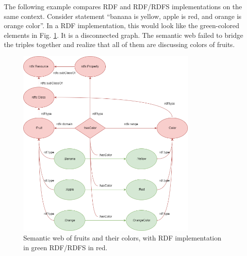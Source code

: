 The following example compares RDF and RDF/RDFS implementations on the same context. Consider statement ``banana is yellow, apple is red, and orange is orange color''. In a RDF implementation, this would look like the green-colored elements in Fig. \ref{fig:fruitexp}. It is a disconnected graph. The semantic web failed to bridge the triples together and realize that all of them are discussing colors of fruits.
\begin{figure}[!htb]
	\centering
	\includegraphics[width=0.8\textwidth]{chapters/part-4/figures/fruitexp.png}
	\caption{Semantic web of fruits and their colors, with RDF implementation in green RDF/RDFS in red.}
	\label{fig:fruitexp}
\end{figure}

